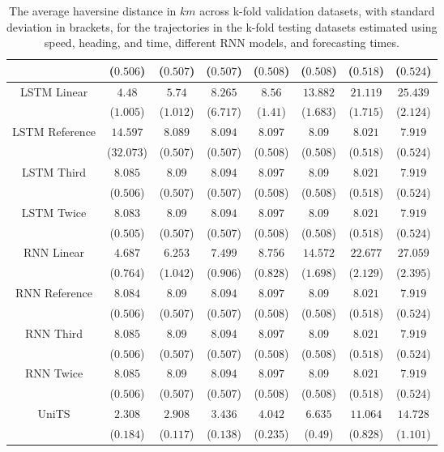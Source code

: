 \begin{table}[!ht]
{\begin{tabular}{|c|c|c|c|c|c|c|c|}
			 & ($0.506$) & ($0.507$) & ($0.507$) & ($0.508$) & ($0.508$) & ($0.518$) & ($0.524$) \\ \hline
			\multirow{2}{*}{LSTM Linear} & $4.48$ & $5.74$ & $8.265$ & $8.56$ & $13.882$ & $21.119$ & $25.439$ \\
			 & ($1.005$) & ($1.012$) & ($6.717$) & ($1.41$) & ($1.683$) & ($1.715$) & ($2.124$) \\ \hline
			\multirow{2}{*}{LSTM Reference} & $14.597$ & $8.089$ & $8.094$ & $8.097$ & $8.09$ & $8.021$ & $7.919$ \\
			 & ($32.073$) & ($0.507$) & ($0.507$) & ($0.508$) & ($0.508$) & ($0.518$) & ($0.524$) \\ \hline
			\multirow{2}{*}{LSTM Third} & $8.085$ & $8.09$ & $8.094$ & $8.097$ & $8.09$ & $8.021$ & $7.919$ \\
			 & ($0.506$) & ($0.507$) & ($0.507$) & ($0.508$) & ($0.508$) & ($0.518$) & ($0.524$) \\ \hline
			\multirow{2}{*}{LSTM Twice} & $8.083$ & $8.09$ & $8.094$ & $8.097$ & $8.09$ & $8.021$ & $7.919$ \\
			 & ($0.505$) & ($0.507$) & ($0.507$) & ($0.508$) & ($0.508$) & ($0.518$) & ($0.524$) \\ \hline
			\multirow{2}{*}{RNN Linear} & $4.687$ & $6.253$ & $7.499$ & $8.756$ & $14.572$ & $22.677$ & $27.059$ \\
			 & ($0.764$) & ($1.042$) & ($0.906$) & ($0.828$) & ($1.698$) & ($2.129$) & ($2.395$) \\ \hline
			\multirow{2}{*}{RNN Reference} & $8.084$ & $8.09$ & $8.094$ & $8.097$ & $8.09$ & $8.021$ & $7.919$ \\
			 & ($0.506$) & ($0.507$) & ($0.507$) & ($0.508$) & ($0.508$) & ($0.518$) & ($0.524$) \\ \hline
			\multirow{2}{*}{RNN Third} & $8.085$ & $8.09$ & $8.094$ & $8.097$ & $8.09$ & $8.021$ & $7.919$ \\
			 & ($0.506$) & ($0.507$) & ($0.507$) & ($0.508$) & ($0.508$) & ($0.518$) & ($0.524$) \\ \hline
			\multirow{2}{*}{RNN Twice} & $8.085$ & $8.09$ & $8.094$ & $8.097$ & $8.09$ & $8.021$ & $7.919$ \\
			 & ($0.506$) & ($0.507$) & ($0.507$) & ($0.508$) & ($0.508$) & ($0.518$) & ($0.524$) \\ \hline
			\multirow{2}{*}{UniTS} & $2.308$ & $2.908$ & $3.436$ & $4.042$ & $6.635$ & $11.064$ & $14.728$ \\
			 & ($0.184$) & ($0.117$) & ($0.138$) & ($0.235$) & ($0.49$) & ($0.828$) & ($1.101$) \\ \hline
		\end{tabular}
	}
	\caption{The average haversine distance in $km$ across k-fold validation datasets, with standard deviation in brackets, for the trajectories in the k-fold testing datasets estimated using speed, heading, and time, different RNN models, and forecasting times.}
	\label{tab:all_speed_actual_dir_haversine}
\end{table}